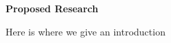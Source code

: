 \documentclass[11pt]{NSFamsart}
\begin{document}

\centerline{\large \bf Proposed Research}

Here is where we give an introduction

\newpage

%
%


\renewcommand{\refname}{\hfil Bibliography \& References Cited \hfil}                   %
\renewcommand{\bibliofont}{\normalsize}


\end{document}
